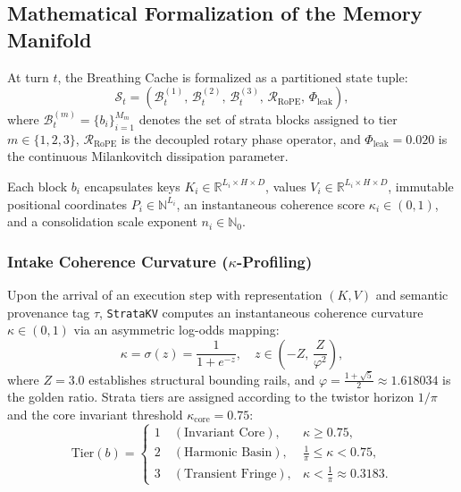 \subsection{Mathematical Formalization of the Memory Manifold}

\begin{definition}
At turn $t$, the Breathing Cache is formalized as a partitioned state tuple:
\begin{equation}
    \mathcal{S}_t = \left( \mathcal{B}_t^{(1)}, \, \mathcal{B}_t^{(2)}, \, \mathcal{B}_t^{(3)}, \, \mathcal{R}_{\text{RoPE}}, \, \Phi_{\text{leak}} \right),
\end{equation}
where $\mathcal{B}_t^{(m)} = \{ b_{i} \}_{i=1}^{M_m}$ denotes the set of strata blocks assigned to tier $m \in \{1, 2, 3\}$, $\mathcal{R}_{\text{RoPE}}$ is the decoupled rotary phase operator, and $\Phi_{\text{leak}} = 0.020$ is the continuous Milankovitch dissipation parameter.
\end{definition}

Each block $b_i$ encapsulates keys $K_i \in \mathbb{R}^{L_i \times H \times D}$, values $V_i \in \mathbb{R}^{L_i \times H \times D}$, immutable positional coordinates $P_i \in \mathbb{N}^{L_i}$, an instantaneous coherence score $\kappa_i \in (0, 1)$, and a consolidation scale exponent $n_i \in \mathbb{N}_0$.

\subsubsection{Intake Coherence Curvature ($\kappa$-Profiling)}
Upon the arrival of an execution step with representation $(K, V)$ and semantic provenance tag $\tau$, \texttt{StrataKV} computes an instantaneous coherence curvature $\kappa \in (0, 1)$ via an asymmetric log-odds mapping:
\begin{equation}
    \kappa = \sigma(z) = \frac{1}{1 + e^{-z}}, \quad z \in \left(-Z, \, \frac{Z}{\varphi^2}\right),
\end{equation}
where $Z = 3.0$ establishes structural bounding rails, and $\varphi = \frac{1 + \sqrt{5}}{2} \approx 1.618034$ is the golden ratio. Strata tiers are assigned according to the twistor horizon $1/\pi$ and the core invariant threshold $\kappa_{\text{core}} = 0.75$:
\begin{equation}
    \text{Tier}(b) = 
    \begin{cases}
        1 \quad (\text{Invariant Core}), & \kappa \ge 0.75, \\
        2 \quad (\text{Harmonic Basin}), & \frac{1}{\pi} \le \kappa < 0.75, \\
        3 \quad (\text{Transient Fringe}), & \kappa < \frac{1}{\pi} \approx 0.3183.
    \end{cases}
\end{equation}

